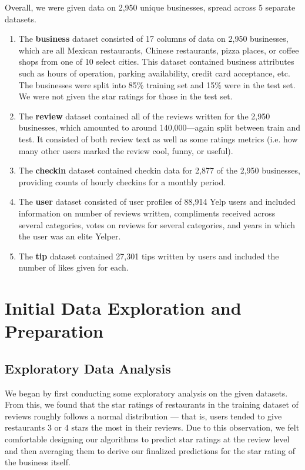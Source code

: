 \documentclass[10pt]{article}
\begin{document}
\noindent
Overall, we were given data on 2,950 unique businesses, spread across 5 separate datasets.
\vspace{0.05in}
\begin{enumerate}[(1)]
    \item The \textbf{business} dataset consisted of 17 columns of data on 2,950 businesses, which are all Mexican restaurants, Chinese restaurants, pizza places, or coffee shops from one of 10 select cities. This dataset contained business attributes such as hours of operation, parking availability, credit card acceptance, etc. The businesses were split into 85\% training set and 15\% were in the test set. We were not given the star ratings for those in the test set.
    \item The \textbf{review} dataset contained all of the reviews written for the 2,950 businesses, which amounted to around 140,000---again split between train and test. It consisted of both review text as well as some ratings metrics (i.e. how many other users marked the review cool, funny, or useful).
    \item The \textbf{checkin} dataset contained checkin data for 2,877 of the 2,950 businesses, providing counts of hourly checkins for a monthly period.
    \item The \textbf{user} dataset consisted of user profiles of 88,914 Yelp users and included information on number of reviews written, compliments received across several categories, votes on reviews for several categories, and years in which the user was an elite Yelper.
    \item The \textbf{tip} dataset contained 27,301 tips written by users and included the number of likes given for each.
\end{enumerate}

\section{Initial Data Exploration and Preparation}
\subsection{Exploratory Data Analysis}
We began by first conducting some exploratory analysis on the given datasets. From this, we found that the star ratings of restaurants in the training dataset of reviews roughly follows a normal distribution --- that is, users tended to give restaurants 3 or 4 stars the most in their reviews. Due to this observation, we felt comfortable designing our algorithms to predict star ratings at the review level and then averaging them to derive our finalized predictions for the star rating of the business itself.
\end{document}
